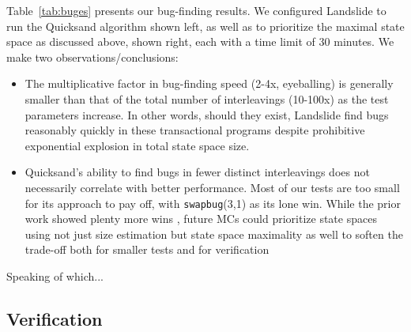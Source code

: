 \documentclass[10pt]{sigplanconf}
\begin{document}
Table~\ref{tab:buges}
presents our bug-finding results.
We configured Landslide to run the Quicksand algorithm \cite{quicksand}
shown left,
as well as to prioritize the maximal state space as discussed above,
shown right,
each with a time limit of 30 minutes.
We make two observations/conclusions:
\begin{itemize}
	\item The multiplicative factor in bug-finding speed (2-4x, eyeballing) is generally smaller
		than that of the total number of interleavings (10-100x)
		as the test parameters increase.
		In other words,
		should they exist,
		Landslide find bugs reasonably quickly in these transactional programs
		despite prohibitive exponential explosion in total state space size.
	\item Quicksand's ability to find bugs in fewer distinct interleavings %
		does not necessarily correlate with better performance. %
		Most of our tests are too small for its approach to pay off,
		with {\tt swapbug}(3,1) as its lone win.
		While the prior work showed plenty more wins \cite{quicksand},
		future MCs could prioritize state spaces using not just size estimation
		but state space maximality as well
		to soften the trade-off
		both for smaller tests and for verification
\end{itemize}
Speaking of which...

\subsection{Verification}
\end{document}
